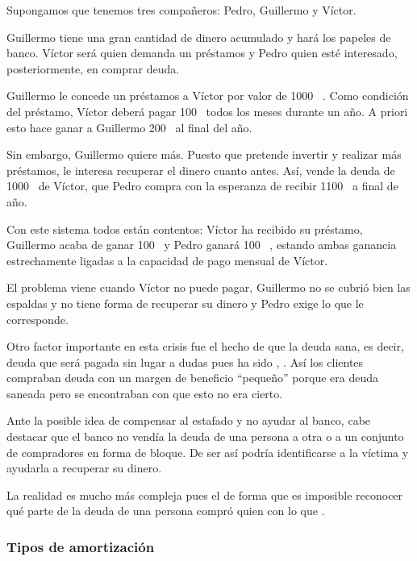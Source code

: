 \documentclass[nochap,palatino,shortheader]{apuntes}
\begin{document}
\begin{example}
Supongamos que tenemos tres compañeros: Pedro, Guillermo y Víctor.

Guillermo tiene una gran cantidad de dinero acumulado y hará los papeles de banco. Víctor será quien demanda un préstamos y Pedro quien esté interesado, posteriormente, en comprar deuda.

Guillermo le concede un préstamos a Víctor por valor de 1000 \texteuro\ . Como condición del préstamo, Víctor deberá pagar 100 \texteuro\  todos los meses durante un año. A priori esto hace ganar a Guillermo 200 \texteuro\  al final del año.

Sin embargo, Guillermo quiere más. Puesto que pretende invertir y realizar más préstamos, le interesa recuperar el dinero cuanto antes. Así, vende la deuda de 1000 \texteuro\  de Víctor, que Pedro compra con la esperanza de recibir 1100 \texteuro\  a final de año.

Con este sistema todos están contentos: Víctor ha recibido su préstamo, Guillermo acaba de ganar 100 \texteuro\  y Pedro ganará 100 \texteuro\ , estando ambas ganancia estrechamente ligadas a la capacidad de pago mensual de Víctor.

El problema viene cuando Víctor no puede pagar, Guillermo no se cubrió bien las espaldas y no tiene forma de recuperar su dinero y Pedro exige lo que le corresponde.
\end{example}

Otro factor importante en esta crisis fue el hecho de que la  deuda sana, es decir, deuda que será pagada sin lugar a dudas pues ha sido , . 
Así los clientes compraban deuda con un margen de beneficio ``pequeño'' porque era deuda saneada pero se encontraban con que esto no era cierto.

Ante la posible idea de compensar al estafado y no ayudar al banco, cabe destacar que el banco no vendía la deuda de una persona a otra o a un conjunto de compradores en forma de bloque. De ser así podría identificarse a la víctima y ayudarla a recuperar su dinero.

La realidad es mucho más compleja pues el  de forma que es imposible reconocer qué parte de la deuda de una persona compró quien con lo que .

\subsubsection{Tipos de amortización}
\end{document}

